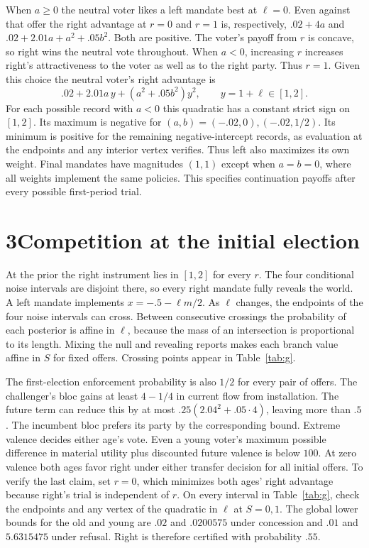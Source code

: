 \documentclass[11pt,letterpaper]{article}
\begin{document}
When $a\ge0$ the neutral voter likes a left mandate best at $\ell=0$. Even against that offer the right advantage at $r=0$ and $r=1$ is, respectively, $.02+4a$ and $.02+2.01a+a^2+.05b^2$. Both are positive. The voter's payoff from $r$ is concave, so right wins the neutral vote throughout. When $a<0$, increasing $r$ increases right's attractiveness to the voter as well as to the right party. Thus $r=1$. Given this choice the neutral voter's right advantage is
\[
       .02+2.01a\,y+(a^2+.05b^2)y^2,\qquad y=1+\ell\in[1,2].
\]
For each possible record with $a<0$ this quadratic has a constant strict sign on $[1,2]$. Its maximum is negative for $(a,b)=(-.02,0),(-.02,1/2)$. Its minimum is positive for the remaining negative-intercept records, as evaluation at the endpoints and any interior vertex verifies. Thus left also maximizes its own weight. Final mandates have magnitudes $(1,1)$ except when $a=b=0$, where all weights implement the same policies. This specifies continuation payoffs after every possible first-period trial.

\newpage
\section*{3\quad Competition at the initial election}
At the prior the right instrument lies in $[1,2]$ for every $r$. The four conditional noise intervals are disjoint there, so every right mandate fully reveals the world. A left mandate implements $x=-.5-\ell m/2$. As $\ell$ changes, the endpoints of the four noise intervals can cross. Between consecutive crossings the probability of each posterior is affine in $\ell$, because the mass of an intersection is proportional to its length. Mixing the null and revealing reports makes each branch value affine in $S$ for fixed offers. Crossing points appear in Table~\ref{tab:g}.

The first-election enforcement probability is also $1/2$ for every pair of offers. The challenger's bloc gains at least $4-1/4$ in current flow from installation. The future term can reduce this by at most $.25(2.04^2+.05\cdot4)$, leaving more than $.5$. The incumbent bloc prefers its party by the corresponding bound. Extreme valence decides either age's vote. Even a young voter's maximum possible difference in material utility plus discounted future valence is below $100$. At zero valence both ages favor right under either transfer decision for all initial offers. To verify the last claim, set $r=0$, which minimizes both ages' right advantage because right's trial is independent of $r$. On every interval in Table~\ref{tab:g}, check the endpoints and any vertex of the quadratic in $\ell$ at $S=0,1$. The global lower bounds for the old and young are $.02$ and $.0200575$ under concession and $.01$ and $5.6315475$ under refusal. Right is therefore certified with probability $.55$.
\end{document}
